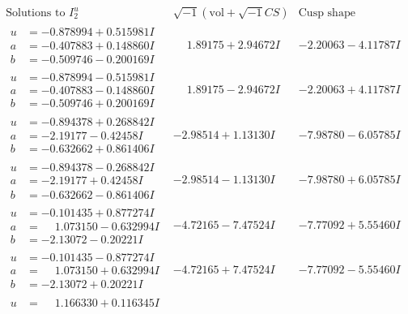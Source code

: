 \documentclass[1p]{elsarticle_modified}
\theoremstyle{definition}
\newcommand{\I}{\sqrt{-1}}
\begin{document}
$$\begin{array}{c|c|c}  
\text{Solutions to }I^u_{2}& \I (\text{vol} + \sqrt{-1}CS) & \text{Cusp shape}\\
 \hline 
\begin{aligned}
u &= -0.878994 + 0.515981 I \\
a &= -0.407883 + 0.148860 I \\
b &= -0.509746 - 0.200169 I\end{aligned}
 & \phantom{-}1.89175 + 2.94672 I & -2.20063 - 4.11787 I \\ \hline\begin{aligned}
u &= -0.878994 - 0.515981 I \\
a &= -0.407883 - 0.148860 I \\
b &= -0.509746 + 0.200169 I\end{aligned}
 & \phantom{-}1.89175 - 2.94672 I & -2.20063 + 4.11787 I \\ \hline\begin{aligned}
u &= -0.894378 + 0.268842 I \\
a &= -2.19177 - 0.42458 I \\
b &= -0.632662 + 0.861406 I\end{aligned}
 & -2.98514 + 1.13130 I & -7.98780 - 6.05785 I \\ \hline\begin{aligned}
u &= -0.894378 - 0.268842 I \\
a &= -2.19177 + 0.42458 I \\
b &= -0.632662 - 0.861406 I\end{aligned}
 & -2.98514 - 1.13130 I & -7.98780 + 6.05785 I \\ \hline\begin{aligned}
u &= -0.101435 + 0.877274 I \\
a &= \phantom{-}1.073150 - 0.632994 I \\
b &= -2.13072 - 0.20221 I\end{aligned}
 & -4.72165 - 7.47524 I & -7.77092 + 5.55460 I \\ \hline\begin{aligned}
u &= -0.101435 - 0.877274 I \\
a &= \phantom{-}1.073150 + 0.632994 I \\
b &= -2.13072 + 0.20221 I\end{aligned}
 & -4.72165 + 7.47524 I & -7.77092 - 5.55460 I \\ \hline\begin{aligned}
u &= \phantom{-}1.166330 + 0.116345 I \\

\end{aligned}
\end{array}$$
\end{document}
